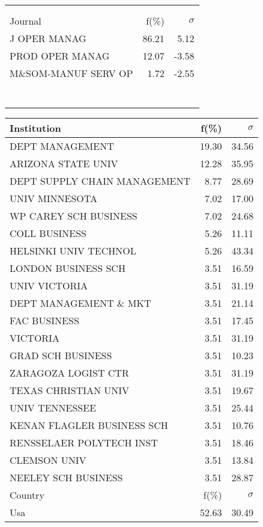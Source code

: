 \documentclass[a4paper,11pt]{report}
\begin{document}
\begin{landscape}
\begin{table}[!ht]
{\begin{tabular}{|l r r|}
 &  & \\
 &  & \\
\hline
\hline
Journal & f(\%) & $\sigma$\\
\hline
J OPER MANAG & 86.21 & 5.12\\
PROD OPER MANAG & 12.07 & -3.58\\
M\&SOM-MANUF SERV OP & 1.72 & -2.55\\
 &  & \\
 &  & \\
 &  & \\
 &  & \\
 &  & \\
 &  & \\
 &  & \\
\hline
\end{tabular}
}
{\scriptsize\begin{tabular}{|l r r|}
\hline
Institution & f(\%) & $\sigma$\\
\hline
DEPT MANAGEMENT & 19.30 & 34.56\\
ARIZONA STATE UNIV & 12.28 & 35.95\\
DEPT SUPPLY CHAIN MANAGEMENT & 8.77 & 28.69\\
UNIV MINNESOTA & 7.02 & 17.00\\
WP CAREY SCH BUSINESS & 7.02 & 24.68\\
COLL BUSINESS & 5.26 & 11.11\\
HELSINKI UNIV TECHNOL & 5.26 & 43.34\\
LONDON BUSINESS SCH & 3.51 & 16.59\\
UNIV VICTORIA & 3.51 & 31.19\\
DEPT MANAGEMENT \& MKT & 3.51 & 21.14\\
FAC BUSINESS & 3.51 & 17.45\\
VICTORIA & 3.51 & 31.19\\
GRAD SCH BUSINESS & 3.51 & 10.23\\
ZARAGOZA LOGIST CTR & 3.51 & 31.19\\
TEXAS CHRISTIAN UNIV & 3.51 & 19.67\\
UNIV TENNESSEE & 3.51 & 25.44\\
KENAN FLAGLER BUSINESS SCH & 3.51 & 10.76\\
RENSSELAER POLYTECH INST & 3.51 & 18.46\\
CLEMSON UNIV & 3.51 & 13.84\\
NEELEY SCH BUSINESS & 3.51 & 28.87\\
\hline
\hline
Country & f(\%) & $\sigma$\\
\hline
Usa & 52.63 & 30.49\\

\end{tabular}}
\end{table}
\end{landscape}
\end{document}
